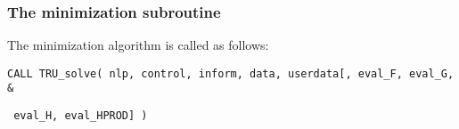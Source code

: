 \documentclass{galahad}
\newcommand{\packagename}{TRU}
\begin{document}

\subsubsection{The minimization subroutine}
The minimization algorithm is called as follows:
\vspace*{1mm}

\hspace{8mm}
{\tt CALL \packagename\_solve( nlp, control, inform, data, userdata[, eval\_F,
eval\_G, \hspace{8mm}                  \&}
\vspace*{-1mm}

\hspace{37mm}
{\tt
eval\_H,  eval\_HPROD] )}
\end{document}
